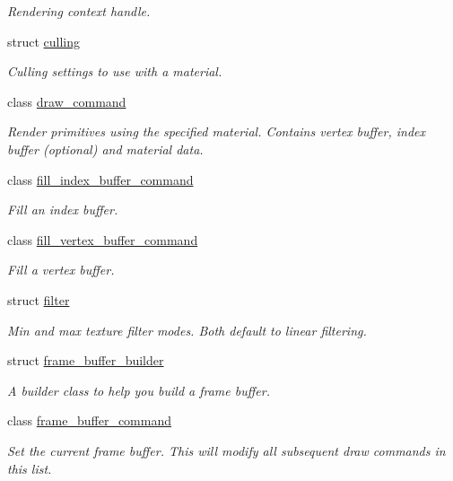 \begin{DoxyCompactItemize}
\begin{DoxyCompactList}\small\item\em Rendering context handle. \end{DoxyCompactList}\item 
struct \mbox{\hyperlink{structmoka_1_1culling}{culling}}
\begin{DoxyCompactList}\small\item\em Culling settings to use with a material. \end{DoxyCompactList}\item 
class \mbox{\hyperlink{classmoka_1_1draw__command}{draw\+\_\+command}}
\begin{DoxyCompactList}\small\item\em Render primitives using the specified material. Contains vertex buffer, index buffer (optional) and material data. \end{DoxyCompactList}\item 
class \mbox{\hyperlink{classmoka_1_1fill__index__buffer__command}{fill\+\_\+index\+\_\+buffer\+\_\+command}}
\begin{DoxyCompactList}\small\item\em Fill an index buffer. \end{DoxyCompactList}\item 
class \mbox{\hyperlink{classmoka_1_1fill__vertex__buffer__command}{fill\+\_\+vertex\+\_\+buffer\+\_\+command}}
\begin{DoxyCompactList}\small\item\em Fill a vertex buffer. \end{DoxyCompactList}\item 
struct \mbox{\hyperlink{structmoka_1_1filter}{filter}}
\begin{DoxyCompactList}\small\item\em Min and max texture filter modes. Both default to linear filtering. \end{DoxyCompactList}\item 
struct \mbox{\hyperlink{structmoka_1_1frame__buffer__builder}{frame\+\_\+buffer\+\_\+builder}}
\begin{DoxyCompactList}\small\item\em A builder class to help you build a frame buffer. \end{DoxyCompactList}\item 
class \mbox{\hyperlink{classmoka_1_1frame__buffer__command}{frame\+\_\+buffer\+\_\+command}}
\begin{DoxyCompactList}\small\item\em Set the current frame buffer. This will modify all subsequent draw commands in this list. \end{DoxyCompactList}\item 

\end{DoxyCompactItemize}

